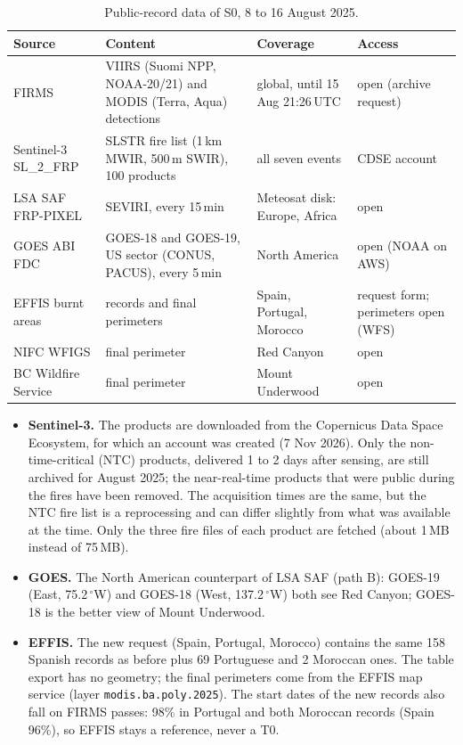 \documentclass[11pt]{article}
\begin{document}
\begin{longtable}{|p{3.2cm}|p{4.2cm}|p{3.4cm}|p{3.6cm}|}
\caption{Public-record data of S0, 8 to 16 August 2025.}\label{tab:s0data}\\
\hline
\rowcolor{tablehead}
\textbf{Source} & \textbf{Content} & \textbf{Coverage} & \textbf{Access} \\
\hline
\endhead
FIRMS & VIIRS (Suomi NPP, NOAA-20/21) and MODIS (Terra, Aqua) detections & global, until 15 Aug 21:26\,UTC & open (archive request) \\
\hline
Sentinel-3 SL\_2\_FRP & SLSTR fire list (1\,km MWIR, 500\,m SWIR), 100 products & all seven events & CDSE account \\
\hline
LSA SAF FRP-PIXEL & SEVIRI, every 15\,min & Meteosat disk: Europe, Africa & open \\
\hline
GOES ABI FDC & GOES-18 and GOES-19, US sector (CONUS, PACUS), every 5\,min & North America & open (NOAA on AWS) \\
\hline
EFFIS burnt areas & records and final perimeters & Spain, Portugal, Morocco & request form; perimeters open (WFS) \\
\hline
NIFC WFIGS & final perimeter & Red Canyon & open \\
\hline
BC Wildfire Service & final perimeter & Mount Underwood & open \\
\hline
\end{longtable}

\begin{itemize}[leftmargin=1.2cm]
    \item \textbf{Sentinel-3.} The products are downloaded from the Copernicus Data Space Ecosystem, for which an account was created (7 Nov 2026). Only the non-time-critical (NTC) products, delivered 1 to 2 days after sensing, are still archived for August 2025; the near-real-time products that were public during the fires have been removed. The acquisition times are the same, but the NTC fire list is a reprocessing and can differ slightly from what was available at the time. Only the three fire files of each product are fetched (about 1\,MB instead of 75\,MB).
    \item \textbf{GOES.} The North American counterpart of LSA SAF (path B): GOES-19 (East, 75.2\,$^\circ$W) and GOES-18 (West, 137.2\,$^\circ$W) both see Red Canyon; GOES-18 is the better view of Mount Underwood.
    \item \textbf{EFFIS.} The new request (Spain, Portugal, Morocco) contains the same 158 Spanish records as before plus 69 Portuguese and 2 Moroccan ones. The table export has no geometry; the final perimeters come from the EFFIS map service (layer \texttt{modis.ba.poly.2025}). The start dates of the new records also fall on FIRMS passes: 98\% in Portugal and both Moroccan records (Spain 96\%), so EFFIS stays a reference, never a T0.
\end{itemize}
\end{document}
